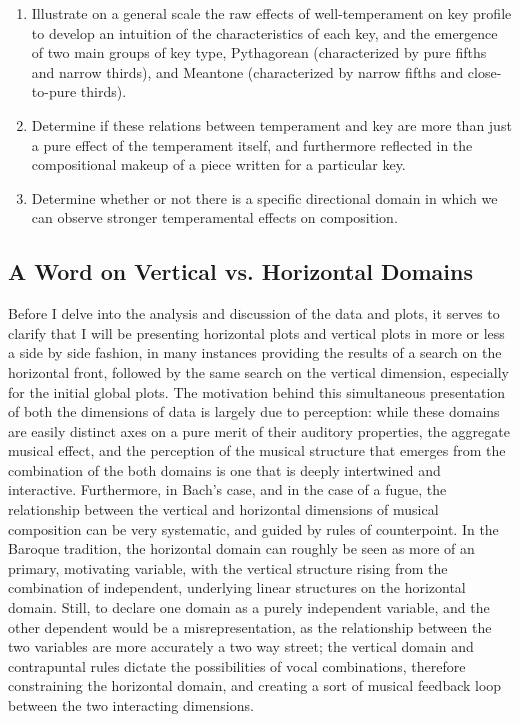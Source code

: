 \begin{enumerate}
\def\labelenumi{\arabic{enumi}.}
\tightlist
\item
  Illustrate on a general scale the raw effects of well-temperament on
  key profile to develop an intuition of the characteristics of each
  key, and the emergence of two main groups of key type, Pythagorean
  (characterized by pure fifths and narrow thirds), and Meantone
  (characterized by narrow fifths and close-to-pure thirds).
\item
  Determine if these relations between temperament and key are more than
  just a pure effect of the temperament itself, and furthermore
  reflected in the compositional makeup of a piece written for a
  particular key.
\item
  Determine whether or not there is a specific directional domain in
  which we can observe stronger temperamental effects on composition.
\end{enumerate}

\subsection{A Word on Vertical vs. Horizontal
Domains}\label{a-word-on-vertical-vs.-horizontal-domains}

Before I delve into the analysis and discussion of the data and plots,
it serves to clarify that I will be presenting horizontal plots and
vertical plots in more or less a side by side fashion, in many instances
providing the results of a search on the horizontal front, followed by
the same search on the vertical dimension, especially for the initial
global plots. The motivation behind this simultaneous presentation of
both the dimensions of data is largely due to perception: while these
domains are easily distinct axes on a pure merit of their auditory
properties, the aggregate musical effect, and the perception of the
musical structure that emerges from the combination of the both domains
is one that is deeply intertwined and interactive. Furthermore, in
Bach's case, and in the case of a fugue, the relationship between the
vertical and horizontal dimensions of musical composition can be very
systematic, and guided by rules of counterpoint. In the Baroque
tradition, the horizontal domain can roughly be seen as more of an
primary, motivating variable, with the vertical structure rising from
the combination of independent, underlying linear structures on the
horizontal domain. Still, to declare one domain as a purely independent
variable, and the other dependent would be a misrepresentation, as the
relationship between the two variables are more accurately a two way
street; the vertical domain and contrapuntal rules dictate the
possibilities of vocal combinations, therefore constraining the
horizontal domain, and creating a sort of musical feedback loop between
the two interacting dimensions.

